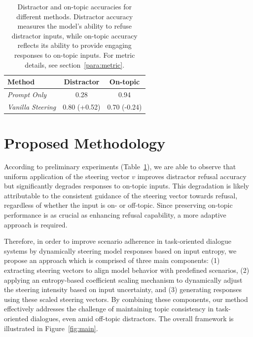 \documentclass[11pt]{article}
\begin{document}
\begin{table}[t]
\centering
\renewcommand{\arraystretch}{1.2} %
\setlength{\tabcolsep}{8pt} %
\begin{tabular}{@{}lcc@{}}
\toprule
\textbf{Method}            & \textbf{Distractor} & \textbf{On-topic} \\ 
\midrule
\textit{Prompt Only}                & 0.28                & 0.94              \\ 
\midrule
\textit{Vanilla Steering}                & 0.80 (+0.52)        & 0.70 (-0.24)      \\ \bottomrule
\end{tabular}
\caption{Distractor and on-topic accuracies for different methods. Distractor accuracy measures the model's ability to refuse distractor inputs, while on-topic accuracy reflects its ability to provide engaging responses to on-topic inputs. For metric details, see section~\ref{para:metric}.}
\label{tab:preliminary}
\end{table}


\section{Proposed Methodology}
According to preliminary experiments (Table~\ref{tab:preliminary}), we are able to observe that uniform application of the steering vector \( v \) improves distractor refusal accuracy but significantly degrades responses to on-topic inputs. This degradation is likely attributable to the consistent guidance of the steering vector towards refusal, regardless of whether the input is on- or off-topic. Since preserving on-topic performance is as crucial as enhancing refusal capability, a more adaptive approach is required.

Therefore, in order to improve scenario adherence in task-oriented dialogue systems by dynamically steering model responses based on input entropy, we propose an approach which is comprised of three main components: (1) extracting steering vectors to align model behavior with predefined scenarios, (2) applying an entropy-based coefficient scaling mechanism to dynamically adjust the steering intensity based on input uncertainty, and (3) generating responses using these scaled steering vectors. By combining these components, our method effectively addresses the challenge of maintaining topic consistency in task-oriented dialogues, even amid off-topic distractors. The overall framework is illustrated in Figure~\ref{fig:main}.
\end{document}
